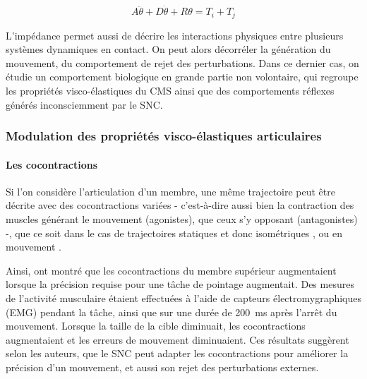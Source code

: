 \begin{equation} \label{eq_impedance_artic_mvt_derugy}
	A\ddot{\theta} + D\dot{\theta} + R\theta = T_i + T_j
\end{equation}

L'impédance permet aussi de décrire les interactions physiques entre plusieurs systèmes dynamiques en contact. On peut alors décorréler la génération du mouvement, du comportement de rejet des perturbations. Dans ce dernier cas, on étudie un comportement biologique en grande partie non volontaire, qui regroupe les propriétés visco-élastiques du CMS ainsi que des comportements réflexes générés inconsciemment par le SNC.

\subsubsection{Modulation des propriétés visco-élastiques articulaires} \label{chap_1_sec_2_subsec_2_visco_elast_char}

\paragraph{Les cocontractions}

Si l'on considère l'articulation d'un membre, une même trajectoire peut être décrite avec des cocontractions variées - c'est-à-dire aussi bien la contraction des muscles générant le mouvement (agonistes), que ceux s'y opposant (antagonistes) -, que ce soit dans le cas de trajectoires statiques et donc isométriques \parencite{dolan_dynamic_1993, newham_knee_2001}, ou en mouvement \parencite{yamazaki_reciprocal_1994, milner_damping_1998, gribble_role_2003}. 

Ainsi, \textcite{gribble_role_2003} ont montré que les cocontractions du membre supérieur augmentaient lorsque la précision requise pour une tâche de pointage augmentait. Des mesures de l'activité musculaire étaient effectuées à l'aide de capteurs électromygraphiques (EMG) pendant la tâche, ainsi que sur une durée de \SI{200}{\milli\second} après l'arrêt du mouvement. Lorsque la taille de la cible diminuait, les cocontractions augmentaient et les erreurs de mouvement diminuaient. Ces résultats suggèrent selon les auteurs, que le SNC peut adapter les cocontractions pour améliorer la précision d'un mouvement, et aussi son rejet des perturbations externes.

